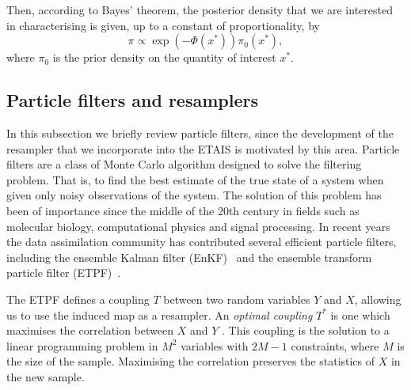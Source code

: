 \documentclass[final]{siamltex}
\begin{document}
Then, according to Bayes' theorem, the posterior density that we
are interested in characterising is given, up to a constant of proportionality, by
\begin{equation*}
	\pi \propto \exp \left ( -\Phi(x^*) \right )\pi_0(x^*),
\end{equation*}
where $\pi_0$ is the prior density on the quantity of interest $x^*$.



\subsection{Particle filters and resamplers}\label{sec:filters}
In this subsection we briefly review particle filters, since the
development of the resampler that we incorporate into the ETAIS is
motivated by this area. Particle filters are a class of Monte Carlo algorithm designed to
solve the filtering problem. That is, to find the best estimate of the
true state of a system when given only noisy observations of the
system. The solution of this problem has been of importance since the
middle of the 20th century in fields such as molecular biology,
computational physics and signal processing. In recent years the data
assimilation community has contributed several efficient particle
filters, including the ensemble Kalman filter
(EnKF)~\cite{evensen1994sequential} and the ensemble transform
particle filter (ETPF)~\cite{reich2013nonparametric}.

The ETPF defines a coupling $T$ between two random variables $Y$ and
$X$, allowing us to use the induced map as a resampler. An \emph{optimal
coupling} $T^*$ is one which maximises the correlation between $X$ and
$Y$ \cite{cotter2012ensemble}. This coupling is the solution to a
linear programming problem in $M^2$ variables with $2M-1$ constraints,
where $M$ is the size of the sample. Maximising the correlation
preserves the statistics of $X$ in the new sample.
\end{document}
